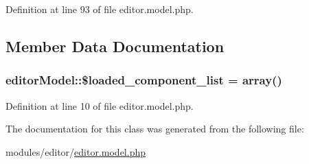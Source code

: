 Definition at line 93 of file editor.\+model.\+php.



\subsection{Member Data Documentation}
\subsubsection[{\texorpdfstring{\$loaded\+\_\+component\+\_\+list}{$loaded_component_list}}]{\setlength{\rightskip}{0pt plus 5cm}editor\+Model\+::\$loaded\+\_\+component\+\_\+list = array()}\hypertarget{classeditorModel_ad909303f399467f4bd587e8369eb40a1}{}\label{classeditorModel_ad909303f399467f4bd587e8369eb40a1}


Definition at line 10 of file editor.\+model.\+php.



The documentation for this class was generated from the following file\+:\begin{DoxyCompactItemize}
\item 
modules/editor/\hyperlink{editor_8model_8php}{editor.\+model.\+php}\end{DoxyCompactItemize}
